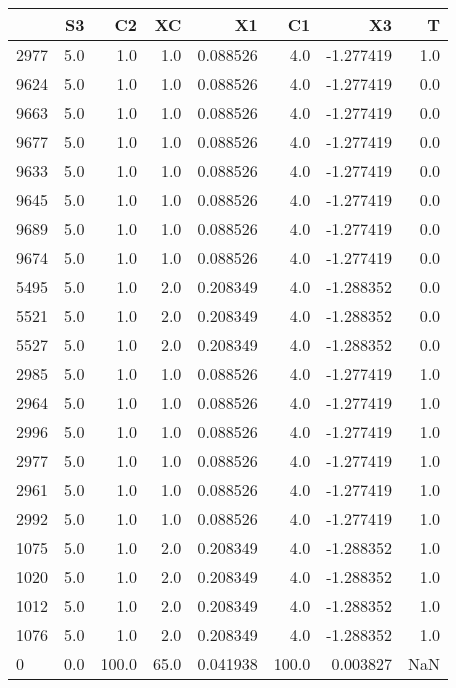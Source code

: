\begin{tabular}{lrrrrrrr}
\toprule
{} &   S3 &     C2 &    XC &        X1 &     C1 &        X3 &    T \\
\midrule
2977 &  5.0 &    1.0 &   1.0 &  0.088526 &    4.0 & -1.277419 &  1.0 \\
9624 &  5.0 &    1.0 &   1.0 &  0.088526 &    4.0 & -1.277419 &  0.0 \\
9663 &  5.0 &    1.0 &   1.0 &  0.088526 &    4.0 & -1.277419 &  0.0 \\
9677 &  5.0 &    1.0 &   1.0 &  0.088526 &    4.0 & -1.277419 &  0.0 \\
9633 &  5.0 &    1.0 &   1.0 &  0.088526 &    4.0 & -1.277419 &  0.0 \\
9645 &  5.0 &    1.0 &   1.0 &  0.088526 &    4.0 & -1.277419 &  0.0 \\
9689 &  5.0 &    1.0 &   1.0 &  0.088526 &    4.0 & -1.277419 &  0.0 \\
9674 &  5.0 &    1.0 &   1.0 &  0.088526 &    4.0 & -1.277419 &  0.0 \\
5495 &  5.0 &    1.0 &   2.0 &  0.208349 &    4.0 & -1.288352 &  0.0 \\
5521 &  5.0 &    1.0 &   2.0 &  0.208349 &    4.0 & -1.288352 &  0.0 \\
5527 &  5.0 &    1.0 &   2.0 &  0.208349 &    4.0 & -1.288352 &  0.0 \\
2985 &  5.0 &    1.0 &   1.0 &  0.088526 &    4.0 & -1.277419 &  1.0 \\
2964 &  5.0 &    1.0 &   1.0 &  0.088526 &    4.0 & -1.277419 &  1.0 \\
2996 &  5.0 &    1.0 &   1.0 &  0.088526 &    4.0 & -1.277419 &  1.0 \\
2977 &  5.0 &    1.0 &   1.0 &  0.088526 &    4.0 & -1.277419 &  1.0 \\
2961 &  5.0 &    1.0 &   1.0 &  0.088526 &    4.0 & -1.277419 &  1.0 \\
2992 &  5.0 &    1.0 &   1.0 &  0.088526 &    4.0 & -1.277419 &  1.0 \\
1075 &  5.0 &    1.0 &   2.0 &  0.208349 &    4.0 & -1.288352 &  1.0 \\
1020 &  5.0 &    1.0 &   2.0 &  0.208349 &    4.0 & -1.288352 &  1.0 \\
1012 &  5.0 &    1.0 &   2.0 &  0.208349 &    4.0 & -1.288352 &  1.0 \\
1076 &  5.0 &    1.0 &   2.0 &  0.208349 &    4.0 & -1.288352 &  1.0 \\
0    &  0.0 &  100.0 &  65.0 &  0.041938 &  100.0 &  0.003827 &  NaN \\
\bottomrule
\end{tabular}
